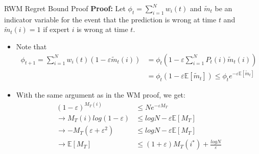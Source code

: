 \documentclass{beamer}
\begin{document}
\begin{frame}{RWM Regret Bound Proof}
    \textbf{Proof:}
    Let $\phi_t = \sum_{i=1}^{N} w_i(t)$ and $\tilde{m}_t$ be an indicator variable for the event that the prediction is wrong at time $t$ and $\tilde{m}_t(i) = 1$ if expert $i$ is wrong at time $t$.
    \begin{itemize}
        \item Note that 
        \begin{align*}
            \phi_{t+1} = \sum_{i=1}^{N} w_i(t)(1-\varepsilon\tilde{m}_t(i)) &= \phi_t (1-\varepsilon\sum_{i=1}^{N} P_t(i)\tilde{m}_t(i)) \\
            &= \phi_t (1-\varepsilon \mathbb{E}[\tilde{m}_t]) \leq \phi_t e^{-\varepsilon \mathbb{E}[\tilde{m}_t]}
        \end{align*}
        \item With the same argument as in the WM proof, we get:
        \begin{align*}
            (1-\varepsilon)^{M_T(i)} &\leq N e^{-\varepsilon M_T}\\
            \rightarrow M_T(i) log(1-\varepsilon) &\leq log N - \varepsilon \mathbb{E}[M_T]\\
            \rightarrow - M_T (\varepsilon + \varepsilon^2) &\leq log N - \varepsilon \mathbb{E}[M_T]\\
            \rightarrow \mathbb{E}[M_T] &\leq (1+\varepsilon)M_T(i^*) + \frac{log N}{\varepsilon}
        \end{align*}
    \end{itemize}
\end{frame}
\end{document}
